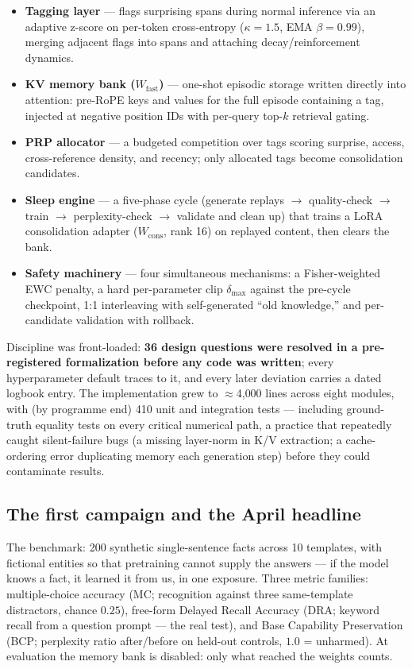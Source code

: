 \documentclass[11pt]{article}
\begin{document}
\begin{itemize}
\item \textbf{Tagging layer} --- flags surprising spans during normal inference via an adaptive
      z-score on per-token cross-entropy ($\kappa = 1.5$, EMA $\beta = 0.99$), merging adjacent
      flags into spans and attaching decay/reinforcement dynamics.
\item \textbf{KV memory bank ($W_{\mathrm{fast}}$)} --- one-shot episodic storage written directly
      into attention: pre-RoPE keys and values for the full episode containing a tag, injected at
      negative position IDs with per-query top-$k$ retrieval gating.
\item \textbf{PRP allocator} --- a budgeted competition over tags scoring surprise, access,
      cross-reference density, and recency; only allocated tags become consolidation candidates.
\item \textbf{Sleep engine} --- a five-phase cycle (generate replays $\to$ quality-check $\to$
      train $\to$ perplexity-check $\to$ validate and clean up) that trains a LoRA consolidation
      adapter ($W_{\mathrm{cons}}$, rank 16) on replayed content, then clears the bank.
\item \textbf{Safety machinery} --- four simultaneous mechanisms: a Fisher-weighted EWC penalty, a
      hard per-parameter clip $\delta_{\max}$ against the pre-cycle checkpoint, 1:1 interleaving
      with self-generated ``old knowledge,'' and per-candidate validation with rollback.
\end{itemize}

Discipline was front-loaded: \textbf{36 design questions were resolved in a pre-registered
formalization before any code was written}; every hyperparameter default traces to it, and every
later deviation carries a dated logbook entry. The implementation grew to $\approx$4{,}000 lines
across eight modules, with (by programme end) 410 unit and integration tests --- including
ground-truth equality tests on every critical numerical path, a practice that repeatedly caught
silent-failure bugs (a missing layer-norm in K/V extraction; a cache-ordering error duplicating
memory each generation step) before they could contaminate results.

\subsection{The first campaign and the April headline}

The benchmark: 200 synthetic single-sentence facts across 10 templates, with fictional entities so
that pretraining cannot supply the answers --- if the model knows a fact, it learned it from us, in
one exposure. Three metric families: multiple-choice accuracy (MC; recognition against three
same-template distractors, chance $0.25$), free-form Delayed Recall Accuracy (DRA; keyword recall
from a question prompt --- the real test), and Base Capability Preservation (BCP; perplexity ratio
after/before on held-out controls, $1.0$ = unharmed). At evaluation the memory bank is disabled:
only what reached the weights counts.
\end{document}
